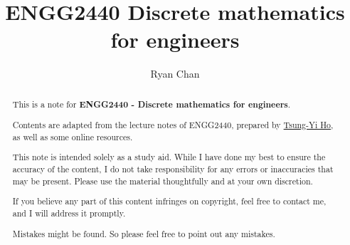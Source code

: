 \documentclass[a4paper]{report}
\author{Ryan Chan}
\title{ENGG2440 Discrete mathematics for engineers}
\begin{document}
\setlength\parindent{0pt}

\maketitle
\newpage

\begin{abstract}
	This is a note for \textbf{ENGG2440 - Discrete mathematics for engineers}. 
	
	Contents are adapted from the lecture notes of ENGG2440, prepared by \href{https://tsungyiho.github.io}{Tsung-Yi Ho}, as well as some online resources.
	
	This note is intended solely as a study aid. While I have done my best to ensure the accuracy of the content, I do not take responsibility for any errors or inaccuracies that may be present. Please use the material thoughtfully and at your own discretion.
	
	If you believe any part of this content infringes on copyright, feel free to contact me, and I will address it promptly.

	Mistakes might be found. So please feel free to point out any mistakes.
\end{abstract}

\newpage

\tableofcontents

\setlength{\parskip}{5pt}
\end{document}
